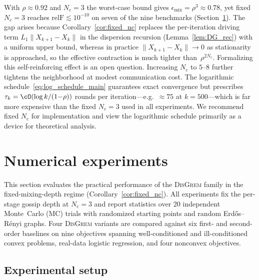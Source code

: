 \documentclass[review,onefignum,onetabnum]{siamart171218}
\begin{document}
	\begin{remark}\label{rem:practical_implications}
		With $\rho\approx 0.92$ and $N_c=3$ the worst-case bound gives
		$\epsilon_{\mathrm{mix}}=\rho^3\approx 0.78$, yet fixed $N_c{=}3$
		reaches $\mathrm{relF}\lesssim 10^{-10}$ on seven of the nine benchmarks
		(Section~\ref{sec:experiments}).
		The gap arises because Corollary~\ref{cor:fixed_nc} replaces the
		per-iteration driving term $L_1\|X_{k+1}{-}X_k\|$ in the
		dispersion recursion (Lemma~\ref{lem:DG_rec}) with a uniform
		upper bound, whereas in practice
		$\|X_{k+1}{-}X_k\|\to 0$ as stationarity is approached, so the
		effective contraction is much tighter than~$\rho^{2N_c}$.
		Formalizing this self-reinforcing effect is an open question.
		Increasing $N_c$ to $5$--$8$ further tightens the neighborhood at
		modest communication cost.
		The logarithmic schedule~\eqref{eq:log_schedule_main} guarantees
		exact convergence but prescribes $\tau_k=\cO(\log k/(1{-}\rho))$
		rounds per iteration---e.g.\ ${\approx}75$ at $k{=}500$---which is
		far more expensive than the fixed $N_c{=}3$ used in all experiments.
		We recommend fixed $N_c$ for implementation and view the
		logarithmic schedule primarily as a device for theoretical analysis.
	\end{remark}
	
	
	
	
	\section{Numerical experiments}\label{sec:experiments}
	
	This section evaluates the practical performance of the
	\textsc{DisGrem} family in the fixed-mixing-depth regime
	(Corollary~\ref{cor:fixed_nc}).
	All experiments fix the per-stage gossip depth at $N_c=3$ and
	report statistics over 20 independent Monte~Carlo (MC) trials with
	randomized starting points and random Erd\H{o}s--R\'{e}nyi graphs.
	Four \textsc{DisGrem} variants are compared against six first- and
	second-order baselines on nine objectives spanning well-conditioned
	and ill-conditioned convex problems, real-data logistic regression,
	and four nonconvex objectives.
	
	\subsection{Experimental setup}\label{ssec:setup}
	
\end{document}
